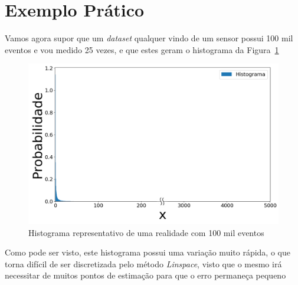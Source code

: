\section{Exemplo Prático}
Vamos agora supor que um \textit{dataset} qualquer vindo de um sensor possui 100 mil eventos e vou medido 25 vezes, e que estes geram o histograma da Figura~\ref{fig:log22}

\begin{figure}[H]
	\centering 
	\includegraphics[width=0.6\linewidth]{./figuras/datalognormal_0_2_2}
	\caption{Histograma representativo de uma realidade com 100 mil eventos}
	\label{fig:log22}
\end{figure}

Como pode ser visto, este histograma possui uma variação muito rápida, o que torna difícil de ser discretizada pelo método \textit{Linspace}, visto que o mesmo irá necessitar de muitos pontos de estimação para que o erro permaneça pequeno

